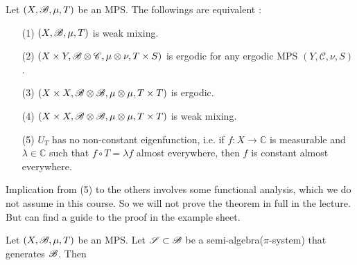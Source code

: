 \documentclass[12pt,a4paper]{report}
\begin{document}
\thm Let $(X,\mathscr{B}, \mu, T)$ be an MPS. The followings are equivalent :
\begin{itemize}
\item[(1)] $(X,\mathscr{B}, \mu, T)$ is weak mixing.
\item[(2)] $(X\times Y,\mathscr{B}\otimes \mathscr{C}, \mu\otimes \nu, T\times S)$ is ergodic for any ergodic MPS $(Y,\mathscr{C},\nu, S)$. 
\item[(3)] $(X\times X,\mathscr{B}\otimes \mathscr{B}, \mu\otimes \mu, T\times T)$ is ergodic.
\item[(4)] $(X\times X,\mathscr{B}\otimes \mathscr{B}, \mu\otimes \mu, T\times T)$ is weak mixing.
\item[(5)] $U_T$ has no non-constant eigenfunction, i.e. if $f:X\rightarrow \mathbb{C}$ is measurable and $\lambda \in \mathbb{C}$ such that $f\circ T = \lambda f$ almost everywhere, then $f$ is constant almost everywhere. 
\end{itemize}
\s

Implication from (5) to the others involves some functional analysis, which we do not assume in this course. So we will not prove the theorem in full in the lecture. But can find a guide to the proof in the example sheet.
\s

\lem Let $(X,\mathscr{B}, \mu, T)$ be an MPS. Let $\mathscr{S} \subset \mathscr{B}$ be a semi-algebra($\pi$-system) that generates $\mathscr{B}$. Then
\end{document}
